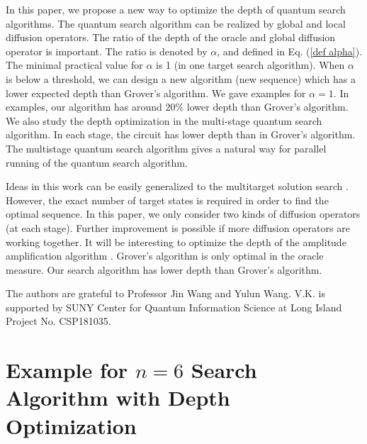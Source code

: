 \documentclass[%
 twocolumn,
 10pt,
 superscriptaddress,
 longbibliography,
 amsmath,amssymb,
 aps,
 pra,
floatfix,
]{revtex4-1}
\begin{document}
In this paper, we propose a new way to optimize the depth of quantum search algorithms. The quantum search algorithm can be realized by global and local diffusion operators. The ratio of the depth of the oracle and  global diffusion operator is important. The ratio is denoted by $\alpha$, and  defined in Eq. (\ref{def alpha}). The minimal practical value for $\alpha$ is 1 (in one target search algorithm). When $\alpha$ is below a threshold, we can design a new algorithm (new sequence) which has a lower expected depth than Grover's algorithm. We gave examples for $\alpha=1$. In examples, our algorithm has around $20\%$ lower depth than Grover's algorithm. We also study the depth optimization in the multi-stage quantum search algorithm. In each stage, the circuit has lower depth than in Grover's algorithm. The multistage quantum search algorithm gives a natural way for parallel running of the quantum search algorithm.

Ideas in this work can be easily generalized to the multitarget solution search \cite{BBHT98}. However, the exact number of target states is required in order to find the optimal sequence. In this paper, we only consider two kinds of diffusion operators (at each stage). Further improvement is possible if more diffusion operators are working together. It will be interesting to optimize the depth of the amplitude amplification algorithm \cite{Grover98,BHMT00}. Grover's algorithm is only optimal in the oracle measure. Our search algorithm has lower depth than Grover's algorithm.

\begin{acknowledgments}

	The authors are grateful to Professor Jin Wang and Yulun Wang. V.K. is supported by SUNY Center for Quantum Information Science at Long Island Project No. CSP181035.

\end{acknowledgments}


\appendix

\section{\label{Appendix examples 6} Example for \texorpdfstring{$n=6$}{Lg} Search Algorithm with Depth Optimization}
\end{document}

